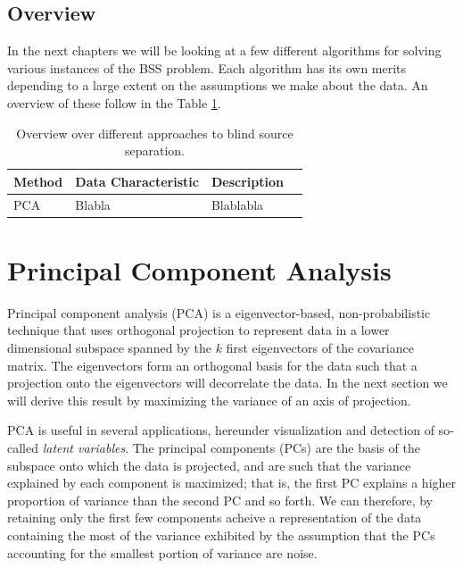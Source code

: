 \documentclass[11pt, oneside, a4paper]{report}
\begin{document}
\section{Overview}

In the next chapters we will be looking at a few different algorithms for solving various instances of the BSS problem. Each algorithm has its own merits depending to a large extent on the assumptions we make about the data. An overview of these follow in the Table \ref{overviewTable}.

\begin{center}
  \begin{table}[h!]
    \begin{tabular}{ | l | l | l | p{5cm} |}
      \hline
      \textbf{Method} & \textbf{Data Characteristic} & \textbf{Description} \\ \hline
      PCA & Blabla & Blablabla \\ 
      \hline
    \end{tabular}
    \caption{Overview over different approaches to blind source separation.}
    \label{overviewTable}
  \end{table}
\end{center}

\chapter{Principal Component Analysis}

Principal component analysis \cite{pearson1901} (PCA) is a eigenvector-based,
non-probabilistic technique that uses orthogonal projection to
represent data in a lower dimensional subspace spanned by the $k$
first eigenvectors of the covariance matrix. The eigenvectors form an
orthogonal basis for the data such that a projection onto the
eigenvectors will decorrelate the data. In the next section we will
derive this result by maximizing the variance of an axis of projection.

PCA is useful in several applications, hereunder visualization and
detection of so-called \emph{latent variables}. The principal
components (PCs) are the basis of the subspace onto which the data is
projected, and are such that the variance explained by each component
is maximized; that is, the first PC explains a higher proportion of
variance than the second PC and so forth. We can therefore, by
retaining only the first few components acheive a representation of
the data containing the most of the variance exhibited by the
assumption that the PCs accounting for the smallest portion of
variance are noise.
\end{document}
